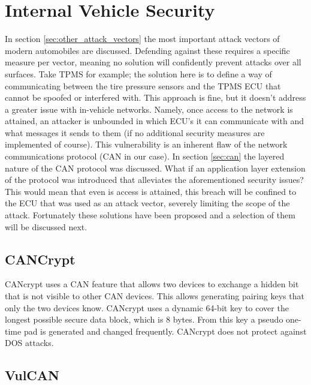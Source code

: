 \section{Internal Vehicle Security}
\label{sec:internal_vehicle_security}

In section \ref{sec:other_attack_vectors} the most important attack vectors of modern automobiles are discussed. Defending against these requires a specific measure per vector, meaning no solution will confidently prevent attacks over all surfaces. Take TPMS for example; the solution here is to define a way of communicating between the tire pressure sensors and the TPMS ECU that cannot be spoofed or interfered with. This approach is fine, but it doesn't address a greater issue with in-vehicle networks. Namely, once access to the network is attained, an attacker is unbounded in which ECU's it can communicate with and what messages it sends to them (if no additional security measures are implemented of course). This vulnerability is an inherent flaw of the network communications protocol (CAN in our case). In section \ref{sec:can} the layered nature of the CAN protocol was discussed. What if an application layer extension of the protocol was introduced that alleviates the aforementioned security issues? This would mean that even is access is attained, this breach will be confined to the ECU that was used as an attack vector, severely limiting the scope of the attack. Fortunately these solutions have been proposed and a selection of them will be discussed next.

\subsection{CANCrypt}
\label{subsec:cancrypt}

CANcrypt uses a CAN feature that allows two devices to exchange a hidden bit that is not visible to other CAN devices. This allows generating pairing keys that only the two devices know. CANcrypt uses a dynamic 64-bit key to cover the longest possible secure data block, which is 8 bytes. From this key a pseudo one-time pad is generated and changed frequently. CANcrypt does not protect against DOS attacks. \cite{Pfeiffer}

\subsection{VulCAN}
\label{subsec:vulcan}

